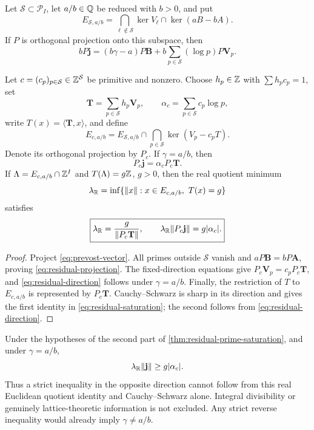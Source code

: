 \begin{theorem}
\label{thm:residual-prime-saturation}
Let \(\mathcal S\subset\mathcal P_I\), let \(a/b\in\mathbb Q\) be reduced with
\(b>0\), and put
\[
 E_{\mathcal S,a/b}
 =\bigcap_{\ell\notin\mathcal S}\ker V_\ell
  \cap\ker(aB-bA).
\]
If \(P\) is orthogonal projection onto this subspace, then
\begin{equation}\label{eq:residual-projection}
 \boxed{\displaystyle
 bP\mathbf j=(b\gamma-a)P\mathbf B
 +b\sum_{p\in\mathcal S}(\log p)P\mathbf V_p.}
\end{equation}

Let \(c=(c_p)_{p\in\mathcal S}\in\mathbb Z^{\mathcal S}\) be primitive and
nonzero.  Choose \(h_p\in\mathbb Z\) with \(\sum h_pc_p=1\), set
\[
 \mathbf T=\sum_{p\in\mathcal S}h_p\mathbf V_p,
 \qquad
 \alpha_c=\sum_{p\in\mathcal S}c_p\log p,
\]
write \(T(x)=\langle\mathbf T,x\rangle\), and define
\[
 E_{c,a/b}=E_{\mathcal S,a/b}
 \cap\bigcap_{p\in\mathcal S}\ker(V_p-c_pT).
\]
Denote its orthogonal projection by \(P_c\).
If \(\gamma=a/b\), then
\begin{equation}\label{eq:residual-direction}
 \boxed{P_c\mathbf j=\alpha_cP_c\mathbf T.}
\end{equation}
If \(\Lambda=E_{c,a/b}\cap\mathbb Z^I\) and \(T(\Lambda)=g\mathbb Z\), \(g>0\), then
the real quotient minimum
\[
 \lambda_\R=\inf\{\|x\|:x\in E_{c,a/b},\ T(x)=g\}
\]
satisfies
\begin{equation}\label{eq:residual-saturation}
 \boxed{\displaystyle
 \lambda_\mathbb R=\frac g{\|P_c\mathbf T\|},
 \qquad
 \lambda_\mathbb R\|P_c\mathbf j\|=g|\alpha_c|.}
\end{equation}
\end{theorem}

\begin{proof}
Project \eqref{eq:prevost-vector}.  All primes outside \(\mathcal S\)
vanish and \(aP\mathbf B=bP\mathbf A\), proving
\eqref{eq:residual-projection}.  The fixed-direction equations give
\(P_c\mathbf V_p=c_pP_c\mathbf T\), and
\eqref{eq:residual-direction} follows under \(\gamma=a/b\).
Finally, the restriction of \(T\) to \(E_{c,a/b}\) is represented by
\(P_c\mathbf T\).  Cauchy--Schwarz is sharp in its direction and gives
the first identity in \eqref{eq:residual-saturation}; the second follows
from \eqref{eq:residual-direction}.
\end{proof}

\begin{corollary}
\label{cor:phase-blind-quotient}
Under the hypotheses of the second part of
\cref{thm:residual-prime-saturation}, and under \(\gamma=a/b\),
\[
 \lambda_\mathbb R\|\mathbf j\|\ge g|\alpha_c|.
\]
Thus a strict inequality in the opposite direction cannot follow from this
real Euclidean quotient identity and Cauchy--Schwarz alone.  Integral
divisibility or genuinely lattice-theoretic information is not excluded.
Any strict reverse inequality would already imply \(\gamma\ne a/b\).
\end{corollary}

